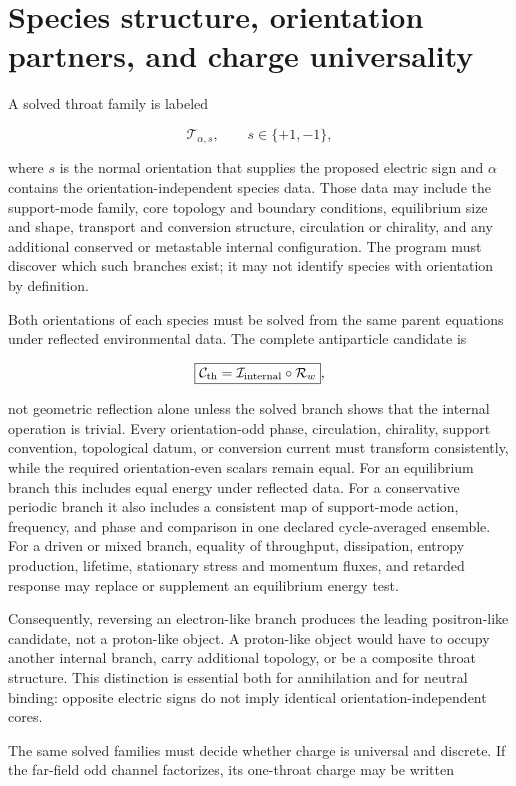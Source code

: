 \section{Species structure, orientation partners, and charge universality}

A solved throat family is labeled

\[
\mathcal T_{\alpha,s},
\qquad
s\in\{+1,-1\},
\]

where \(s\) is the normal orientation that supplies the proposed electric sign
and \(\alpha\) contains the orientation-independent species data. Those data may
include the support-mode family, core topology and boundary conditions,
equilibrium size and shape, transport and conversion structure, circulation or
chirality, and any additional conserved or metastable internal configuration.
The program must discover which such branches exist; it may not identify species
with orientation by definition.

Both orientations of each species must be solved from the same parent equations
under reflected environmental data. The complete antiparticle candidate is

\[
\boxed{
\mathcal C_{\rm th}
=
\mathcal I_{\rm internal}\circ\mathcal R_w
},
\]

not geometric reflection alone unless the solved branch shows that the internal
operation is trivial. Every orientation-odd phase, circulation, chirality,
support convention, topological datum, or conversion current must transform
consistently, while the required orientation-even scalars remain equal. For an
equilibrium branch this includes equal energy under reflected data. For a
conservative periodic branch it also includes a consistent map of support-mode
action, frequency, and phase and comparison in one declared cycle-averaged
ensemble. For a driven or mixed branch, equality of throughput, dissipation,
entropy production, lifetime, stationary stress and momentum fluxes, and
retarded response may replace or supplement an equilibrium energy test.

Consequently, reversing an electron-like branch produces the leading
positron-like candidate, not a proton-like object. A proton-like object would
have to occupy another internal branch, carry additional topology, or be a
composite throat structure. This distinction is essential both for annihilation
and for neutral binding: opposite electric signs do not imply identical
orientation-independent cores.

The same solved families must decide whether charge is universal and discrete.
If the far-field odd channel factorizes, its one-throat charge may be written

